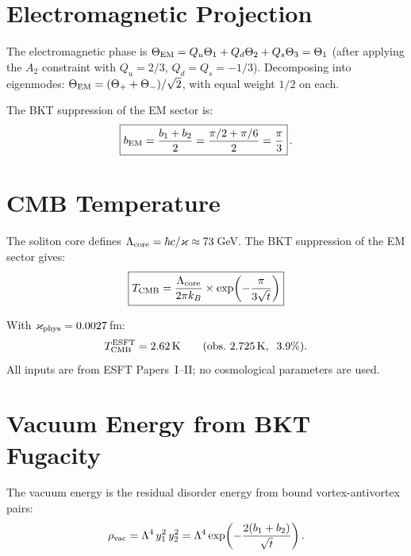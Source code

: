 \documentclass[twocolumn,preprintnumbers,amsmath,amssymb,prd]{revtex4-2}
\begin{document}
\section{Electromagnetic Projection}
\label{sec:em_projection}

The electromagnetic phase is $\Theta_{\rm EM} = Q_u\Theta_1 + Q_d\Theta_2 + Q_s\Theta_3 = \Theta_1$ (after applying the $A_2$ constraint with $Q_u = 2/3$, $Q_d = Q_s = -1/3$).
Decomposing into eigenmodes: $\Theta_{\rm EM} = (\Theta_+ + \Theta_-)/\sqrt{2}$, with equal weight $1/2$ on each.

The BKT suppression of the EM sector is:
\begin{equation}
\boxed{b_{\rm EM} = \frac{b_1 + b_2}{2} = \frac{\pi/2 + \pi/6}{2} = \frac{\pi}{3}}\,.
\label{eq:b_em}
\end{equation}

\section{CMB Temperature}
\label{sec:cmb}

The soliton core defines $\Lambda_{\rm core} = \hbar c/\varkappa \approx 73\,$GeV.
The BKT suppression of the EM sector gives:
\begin{equation}
\boxed{T_{\rm CMB} = \frac{\Lambda_{\rm core}}{2\pi k_B} \times \exp\!\left(-\frac{\pi}{3\sqrt{t}}\right)}
\label{eq:Tcmb}
\end{equation}

With $\varkappa_{\rm phys} = 0.0027\,$fm:
\begin{equation}
T_{\rm CMB}^{\rm ESFT} = 2.62\,\text{K}\qquad(\text{obs.\ }2.725\,\text{K},\;\;3.9\%).
\end{equation}
All inputs are from ESFT Papers~I--II; no cosmological parameters are used.

\section{Vacuum Energy from BKT Fugacity}
\label{sec:vacuum}

The vacuum energy is the residual disorder energy from bound vortex-antivortex pairs:
\begin{equation}
\rho_{\rm vac} = \Lambda^4\,y_1^2\,y_2^2 = \Lambda^4\exp\!\left(-\frac{2(b_1+b_2)}{\sqrt{t}}\right).
\end{equation}
\end{document}
